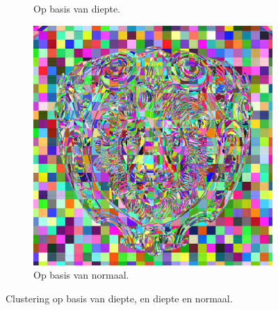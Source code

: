 \begin{figure}
\begin{subfigure}[b]{0.32\textwidth}
    \caption{Op basis van diepte.}
    \label{fig:cs-opdeling-voorbeeld:depth}
  \end{subfigure}%
  \begin{subfigure}[b]{0.32\textwidth}
    \includegraphics[width=\textwidth]{./img/raw/cs-opdeling-voorbeeld/normal.png}
    \caption{Op basis van normaal.}
    \label{fig:cs-opdeling-voorbeeld:normaal}
  \end{subfigure}
  \caption{Clustering op basis van diepte, en diepte en normaal.}
  \label{fig:cs-opdeling-voorbeeld}
\end{figure}
